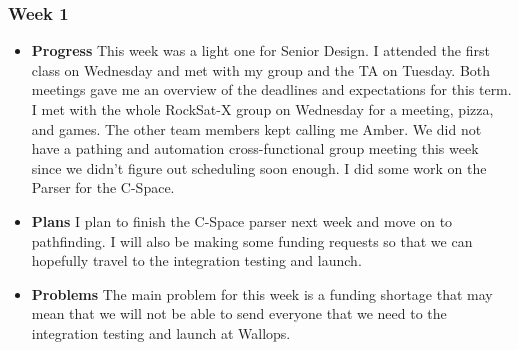 \subsubsection{Week 1}
\begin{itemize}
\item{
\textbf{Progress}
This week was a light one for Senior Design. I attended the first class on Wednesday and met with my group and the TA on Tuesday. Both meetings gave me an overview of the deadlines and expectations for this term. I met with the whole RockSat-X group on Wednesday for a meeting, pizza, and games. The other team members kept calling me Amber. We did not have a pathing and automation cross-functional group meeting this week since we didn't figure out scheduling soon enough. I did some work on the Parser for the C-Space.
}
\item{
\textbf{Plans}
I plan to finish the C-Space parser next week and move on to pathfinding. I will also be making some funding requests so that we can hopefully travel to the integration testing and launch.
}
\item{
\textbf{Problems}
The main problem for this week is a funding shortage that may mean that we will not be able to send everyone that we need to the integration testing and launch at Wallops.
}
\end{itemize}

